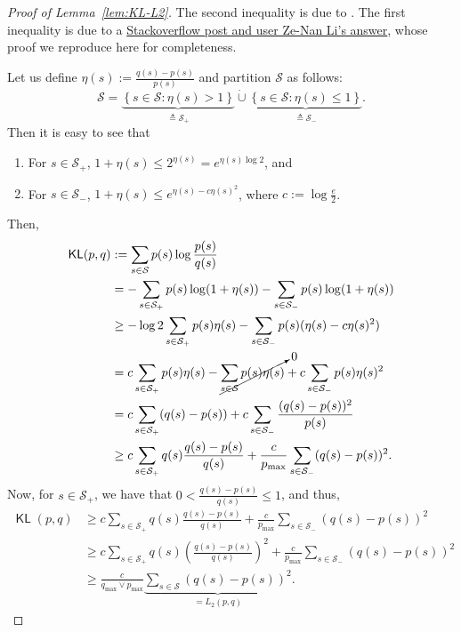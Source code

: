 \documentclass[twoside]{article}
\DeclareMathOperator{\KL}{{\mathsf{KL}}}
\def\gS{{\mathcal{S}}}
\theoremstyle{plain}
\begin{document}
\begin{proof}[Proof of Lemma~\ref{lem:KL-L2}]
    The second inequality is due to \citet[Lemma 6.1]{csiszar2006tree}.
    The first inequality is due to a \href{https://mathoverflow.net/questions/393458/is-there-an-inequality-relation-between-kl-divergence-and-l-2-norm/434695#434695}{Stackoverflow post and user Ze-Nan Li's answer}, whose proof we reproduce here for completeness.

    Let us define $\eta(s) := \frac{q(s) - p(s)}{p(s)}$ and partition $\gS$ as follows:
    \begin{equation}
        \gS = \underbrace{\left\{ s \in \gS : \eta(s) > 1 \right\}}_{\triangleq \gS_+} \dot{\cup} \underbrace{\left\{ s \in \gS : \eta(s) \leq 1 \right\}}_{\triangleq \gS_-}.
    \end{equation}
    Then it is easy to see that
    \begin{enumerate}
        \item[(i)] For $s \in \gS_+$, $1 + \eta(s) \leq 2^{\eta(s)} = e^{\eta(s) \log 2}$, and
        \item[(ii)] For $s \in \gS_-$, $1 + \eta(s) \leq e^{\eta(s) - c \eta(s)^2}$, where $c := \log\frac{e}{2}$.
    \end{enumerate}
    Then,
    \begin{align*}
        \KL(p, q) &:= \sum_{s \in \gS} p(s) \log\frac{p(s)}{q(s)} \\
        &= - \sum_{s \in \gS_+} p(s) \log(1 + \eta(s)) - \sum_{s \in \gS_-} p(s) \log(1 + \eta(s)) \\
        &\geq - \log 2 \sum_{s \in \gS_+} p(s) \eta(s) - \sum_{s \in \gS_-} p(s) (\eta(s) - c \eta(s)^2) \\
        &= c \sum_{s \in \gS_+} p(s) \eta(s) - \cancelto{0}{\sum_{s \in \gS} p(s) \eta(s)} + c \sum_{s \in \gS_-} p(s) \eta(s)^2 \\
        &= c \sum_{s \in \gS_+} (q(s) - p(s)) + c \sum_{s \in \gS_-} \frac{(q(s) - p(s))^2}{p(s)} \\
        &\geq c \sum_{s \in \gS_+} q(s) \frac{q(s) - p(s)}{q(s)} + \frac{c}{p_{\max}} \sum_{s \in \gS_-} (q(s) - p(s))^2.
    \end{align*}
    Now, for $s \in \gS_+$, we have that $0 < \frac{q(s) - p(s)}{q(s)} \leq 1$, and thus,
    \begin{align*}
        \KL(p, q) &\geq c \sum_{s \in \gS_+} q(s) \frac{q(s) - p(s)}{q(s)} + \frac{c}{p_{\max}} \sum_{s \in \gS_-} (q(s) - p(s))^2 \\
        &\geq c \sum_{s \in \gS_+} q(s) \left( \frac{q(s) - p(s)}{q(s)} \right)^2 + \frac{c}{p_{\max}} \sum_{s \in \gS_-} (q(s) - p(s))^2 \\
        &\geq \frac{c}{q_{\max} \vee p_{\max}} \underbrace{\sum_{s \in \gS} (q(s) - p(s))^2}_{= L_2(p, q)}.
    \end{align*}
\end{proof}
\end{document}
